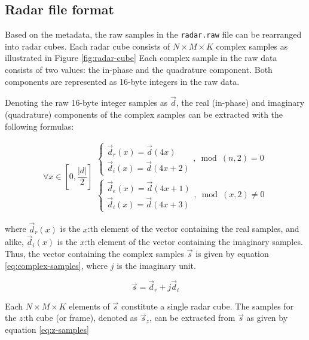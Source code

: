 \subsection{Radar file format}
\label{sec:radar-data}

Based on the metadata, the raw samples in the \texttt{radar.raw} file can be rearranged into radar cubes.
Each radar cube consists of $N \times M \times K$ complex samples as illustrated in Figure \ref{fig:radar-cube}
Each complex sample in the raw data consists of two values: the in-phase and the quadrature component.
Both components are represented as 16-byte integers in the raw data.

Denoting the raw 16-byte integer samples as $\vec{d}$, the real (in-phase) and imaginary (quadrature) components
of the complex samples can be extracted with the following formulas:

\begin{equation}
    \forall x \in \left[ 0, \frac{|d|}{2} \right] \begin{split}
        \begin{cases}
            \vec{d}_r(x) = \vec{d}(4x) \\
            \vec{d}_i(x) = \vec{d}(4x+2)
        \end{cases} ,\bmod(n, 2) = 0 \\
        \begin{cases}
            \vec{d}_e(x) = \vec{d}(4x+1) \\
            \vec{d}_i(x) = \vec{d}(4x+3)
        \end{cases} ,\bmod(x, 2) \neq 0
    \end{split}
\end{equation}

where $\vec{d}_{r}(x)$ is the $x$:th element of the vector containing the real samples,
and alike, $\vec{d}_{i}(x)$ is the $x$:th element of the vector containing the imaginary samples.
Thus, the vector containing the complex samples $\vec{s}$ is given by equation \ref{eq:complex-samples}, where $j$ is the imaginary unit.

\begin{equation}
    \label{eq:complex-samples}
    \vec{s} = \vec{d}_{r} + j\vec{d}_{i}
\end{equation}

Each $N \times M \times K$ elements of $\vec{s}$ constitute a single radar cube.
The samples for the $z$:th cube (or frame), denoted as $\vec{s}_{z}$, can be extracted from $\vec{s}$ as given by equation \ref{eq:z-samples} 

